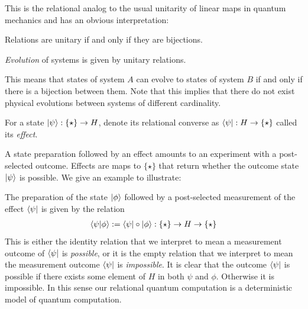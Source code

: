 \noindent This is the relational analog to the usual unitarity of linear maps in quantum mechanics and has an obvious interpretation:

\begin{corollary}
\label{cor:bijections}
Relations are unitary if and only if they are bijections.
\end{corollary}

\begin{axiom}
\emph{Evolution} of systems is given by unitary relations.
\end{axiom}

\noindent This means that states of system $A$ can evolve to states of system $B$ if and only if there is a bijection between them. Note that this implies that there do not exist physical evolutions between systems of different cardinality. %

\begin{defn}
For a state $| \psi \rangle:\{\star\}\to H$, denote its relational converse as $\langle \psi |:H\to\{\star\}$ called its \emph{effect}.
\end{defn}

\noindent A state preparation followed by an effect amounts to an experiment with a post-selected outcome. Effects are maps to $\{\star\}$ that return whether the outcome state $| \psi \rangle$ is possible.
 We give an example to illustrate:
\begin{example}
The preparation of the state $| \phi \rangle$ followed by a post-selected measurement of the effect $\langle \psi |$ is given by the relation
\begin{align*}
\langle\psi|\phi\rangle:=\langle \psi |\circ| \phi \rangle:\{\star\}\to H\to \{\star\}
\end{align*}
This is either the identity relation that we interpret to mean a measurement outcome of $\langle \psi |$ is \emph{possible}, or it is the empty relation that we interpret to mean the measurement outcome $\langle \psi |$ is \emph{impossible}. It is clear that the outcome $\langle \psi |$ is possible if there exists some element of $H$ in both $\psi$ and $\phi$. Otherwise it is impossible.
In this sense our relational quantum computation is a deterministic model of quantum computation.
\end{example}

